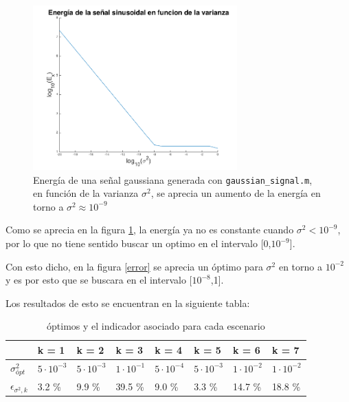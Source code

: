 \documentclass[letterpaper,11pt]{article}
\begin{document}
\begin{figure}[H]
\centering
\includegraphics[width=0.7\textwidth]{img/parte_d/energia.png}
\caption{Energía de una señal gaussiana generada con \texttt{gaussian\_signal.m}, en función de la varianza $\sigma^{2}$, se aprecia un aumento de la energía en torno a $\sigma^{2} \approx 10^{-9}$}
\label{energia}
\end{figure}

Como se aprecia en la figura \ref{energia}, la energía ya no es constante cuando $\sigma^2 < 10^{-9}$, por lo que no tiene sentido buscar un optimo en el intervalo [0,$10^{-9}$].

Con esto dicho, en la figura \ref{error} se aprecia un óptimo para $\sigma^2$ en torno a $10^{-2}$ y es por esto que se buscara en el intervalo [$10^{-8}$,1].

Los resultados de esto se encuentran en la siguiente tabla:

\begin{table}[H]
\centering
\caption{óptimos y el indicador asociado para cada escenario}
\label{gaussiana}
\begin{tabular}{l|l|l|l|l|l|l|l|}
\cline{2-8}
                                                                      & \cellcolor[HTML]{C0C0C0}k = 1 & \cellcolor[HTML]{C0C0C0}k = 2 & \cellcolor[HTML]{C0C0C0}k = 3 & \cellcolor[HTML]{C0C0C0}k = 4 & \cellcolor[HTML]{C0C0C0}k = 5 & \cellcolor[HTML]{C0C0C0}k = 6 & \cellcolor[HTML]{C0C0C0}k = 7 \\ \hline
\multicolumn{1}{|l|}{\cellcolor[HTML]{C0C0C0}$\sigma^{2}_{ópt}$}      & $5\cdot 10^{-3}$              & $5\cdot 10^{-3}$              & $1\cdot 10^{-1}$              & $5\cdot 10^{-4}$              & $5\cdot 10^{-3}$              & $1\cdot 10^{-2}$              & $1\cdot 10^{-2}$              \\ \hline
\multicolumn{1}{|l|}{\cellcolor[HTML]{C0C0C0}$\epsilon_{\sigma^2,k}$} & 3.2 \%                        & 9.9 \%                        & 39.5 \%                         & 9.0 \%                        & 3.3 \%                        & 14.7 \%                       & 18.8 \%                       \\ \hline
\end{tabular}
\end{table}
\end{document}

